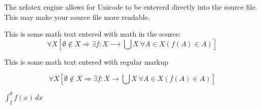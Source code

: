 \documentclass[12pt]{article}
\begin{document}
The xelatex engine allows for Unicode to be entererd directly into the
source file.  This may make your source file more readable.

This is some math text entered with math in the source:
\[
∀X [ ∅ ∉ X ⇒ ∃f:X ⟶  ⋃ X\ ∀A ∈ X (f(A) ∈ A ) ]\]

This is some math text entered with regular markup

\[
\forall X [\emptyset \not\in X \Rightarrow \exists f:X \rightarrow  \bigcup X\ 
    \forall A \in X (f(A) \in A ) ]\]

$∫_ξ^θ f(x)\,dx$


\end{document}
